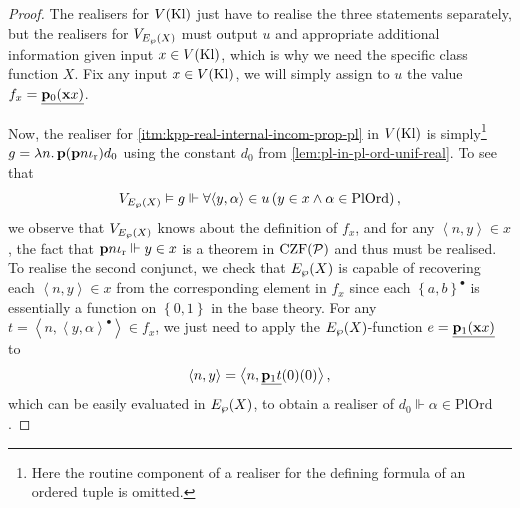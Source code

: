 \documentclass[12pt,openany]{book}
\theoremstyle{plain}
\theoremstyle{definition}
\newcommand\tuple[1]{\left\langle #1 \right\rangle}
\newcommand\opA[1]{\mathop{\forall #1}}
\newcommand\oplam[1]{\mathop{\lambda #1.}}
\newcommand\Pow{\mathcal{P}}
\newcommand\CZFP{\mathrm{CZF}\mleft(\Pow\mright)}
\newcommand\PlOrd{\mathrm{PlOrd}}
\newcommand\Kl{\mathrm{Kl}}
\newcommand\bp{\mathbf{p}}
\newcommand\bx{\mathbf{x}}
\newcommand\ior{\iota_\textup{r}}
\begin{document}
\begin{proof}
  The realisers for $V\mleft(\Kl\mright)$ just have to realise the three statements separately, but the realisers for $V_{E_\wp\mleft(X\mright)}$ must output $u$ and appropriate additional information given input $x \in V\mleft(\Kl\mright)$, which is why we need the specific class function $X$. Fix any input $x \in V\mleft(\Kl\mright)$, we will simply assign to $u$ the value $f_x = \underline{\bp_0 \mleft(\bx x\mright)}$.

  Now, the realiser for \ref{itm:kpp-real-internal-incom-prop-pl} in $V\mleft(\Kl\mright)$ is simply\footnote{Here the routine component of a realiser for the defining formula of an ordered tuple is omitted.} $g = \oplam{n} \bp \mleft(\bp n \ior\mright) d_0$ using the constant $d_0$ from \autoref{lem:pl-in-pl-ord-unif-real}. To see that
  \[V_{E_\wp\mleft(X\mright)} \vDash g \Vdash \opA{{\tuple{y, \alpha} \in u}} \left(y \in x \land \alpha \in \PlOrd\right),\]
  we observe that $V_{E_\wp\mleft(X\mright)}$ knows about the definition of $f_x$, and for any $\tuple{n, y} \in x$, the fact that $\bp n \ior \Vdash y \in x$ is a theorem in $\CZFP$ and thus must be realised. To realise the second conjunct, we check that $E_\wp\mleft(X\mright)$ is capable of recovering each $\tuple{n, y} \in x$ from the corresponding element in $f_x$ since each $\left\{a, b\right\}^\bullet$ is essentially a function on $\left\{0, 1\right\}$ in the base theory. For any $t = \tuple{n, \tuple{y, \alpha}^\bullet} \in f_x$, we just need to apply the $E_\wp\mleft(X\mright)$-function $e = \underline{\bp_1 \mleft(\bx x\mright)}$ to
  \[\tuple{n, y} = \tuple{n, \underline{\bp_1 t}\mleft(0\mright)\mleft(0\mright)},\]
  which can be easily evaluated in $E_{\wp}\mleft(X\mright)$, to obtain a realiser of $d_0 \Vdash \alpha \in \PlOrd$.


\end{proof}
\end{document}

